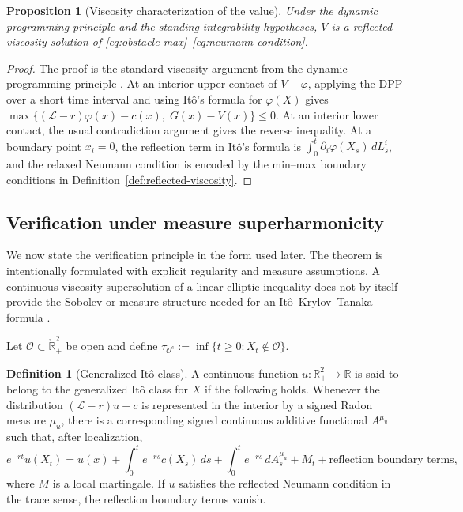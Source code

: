 \documentclass[pdflatex,sn-mathphys-num]{sn-jnl}
\theoremstyle{plain}
\newtheorem{proposition}[theorem]{Proposition}
\theoremstyle{definition}
\newtheorem{definition}[theorem]{Definition}
\newcommand{\R}{\mathbb{R}}
\newcommand{\interior}[1]{\mathring{#1}}
\begin{document}
\begin{proposition}[Viscosity characterization of the value]
\label{prop:value-viscosity}
Under the dynamic programming principle and the standing integrability
hypotheses, $V$ is a reflected viscosity solution of
\eqref{eq:obstacle-max}--\eqref{eq:neumann-condition}.
\end{proposition}
\begin{proof}
The proof is the standard viscosity argument from the dynamic programming
principle \cite{crandall1992user,peskir2006optimal,gao2022rolling}. At an interior
upper contact of $V-\varphi$, applying the DPP over a short time interval and
using It\^o's formula for $\varphi(X)$ gives
$\max\{(\mathcal L-r)\varphi(x)-c(x),\;G(x)-V(x)\}\le0$. At an interior lower
contact, the usual contradiction argument gives the reverse inequality. At a
boundary point $x_i=0$, the reflection term in It\^o's formula is
$\int_0^t \partial_i\varphi(X_s)\,dL_s^i$, and the relaxed Neumann condition is
encoded by the min--max boundary conditions in
Definition~\ref{def:reflected-viscosity}.
\end{proof}

\subsection{Verification under measure superharmonicity}
\label{sec:verification-measure-superharmonicity}
We now state the verification principle in the form used later. The theorem is
intentionally formulated with explicit regularity and measure assumptions. A
continuous viscosity supersolution of a linear elliptic inequality does not by
itself provide the Sobolev or measure structure needed for an
It\^o--Krylov--Tanaka formula \cite{krylov1987approach}.

Let $\mathcal O\subset\interior{\R}^2_+$ be open and define
$\tau_{\mathcal O^c}:=\inf\{t\ge0:X_t\notin\mathcal O\}$.

\begin{definition}[Generalized It\^o class]
\label{def:generalized-ito-class}
A continuous function $u:\R^2_+\to\R$ is said to belong to the generalized
It\^o class for $X$ if the following holds. Whenever the distribution
$(\mathcal L-r)u-c$ is represented in the interior by a signed Radon measure
$\mu_u$, there is a corresponding signed continuous additive functional
$A^{\mu_u}$ such that, after localization,
\[
   e^{-rt}u(X_t)
   =
   u(x)
   +\int_0^t e^{-rs}c(X_s)\,ds
   +\int_0^t e^{-rs}\,dA_s^{\mu_u}
   +M_t
   +\text{reflection boundary terms},
\]
where $M$ is a local martingale. If $u$ satisfies the reflected Neumann
condition in the trace sense, the reflection boundary terms vanish.
\end{definition}
\end{document}
